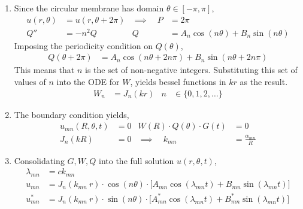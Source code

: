 \begin{enumerate}
    \item Since the circular membrane has domain $ \theta \in [-\pi, \pi] $,
          \begin{align}
              u(r, \theta)     & = u(r, \theta + 2\pi)                 &
              \implies \quad P & = 2\pi                                  \\
              Q''              & = -n^2 Q                              &
              Q                & = A_n\cos(n\theta) + B_n\sin(n\theta)
          \end{align}
          Imposing the periodicity condition on $ Q(\theta) $,
          \begin{align}
              Q(\theta + 2\pi) & = A_n \cos(n\theta + 2n\pi)
              + B_n \sin(n\theta + 2n\pi)
          \end{align}
          This means that $ n $ is the set of non-negative integers. Substituting this
          set of values of $ n $ into the ODE for $ W $, yields bessel functions in
          $ kr $ as the result.
          \begin{align}
              W_n & = J_n(kr) & n & \in \{0,1,2,\dots\}
          \end{align}

    \item The boundary condition yields,
          \begin{align}
              u_{mn}(R, \theta, t)            & = 0                     &
              W(R) \cdot Q(\theta) \cdot G(t) & = 0                       \\
              J_n(kR)                         & = 0                     &
              \implies \quad k_{mn}           & = \frac{\alpha_{mn}}{R}
          \end{align}

    \item Consolidating $ G, W, Q $ into the full solution $ u(r, \theta, t) $,
          \begin{align}
              \lambda_{mn} & = ck_{mn}                                        \\
              u_{mn}       & = J_n(k_{mn}\ r) \cdot \cos(n\theta) \cdot \Big[
              A_{mn} \cos(\lambda_{mn}t) + B_{mn} \sin(\lambda_{mn}t) \Big]   \\
              u^*_{mn}     & = J_n(k_{mn}\ r) \cdot \sin(n\theta) \cdot \Big[
                  A^*_{mn} \cos(\lambda_{mn}t) + B^*_{mn} \sin(\lambda_{mn}t) \Big]
          \end{align}


\end{enumerate}
